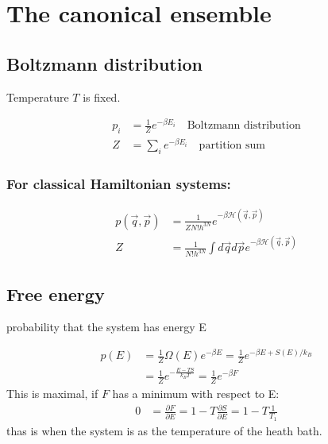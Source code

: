 \section{The canonical ensemble}

\subsection*{Boltzmann distribution}
Temperature $T$ is fixed. 

\begin{equation*}
    \begin{aligned}
        p_i &= \frac{1}{Z} e^{- \beta E_i} \quad \text{Boltzmann distribution} \\
        Z &= \sum_i e^{- \beta E_i} \quad \text{partition sum}
    \end{aligned}
\end{equation*}

\subsubsection*{For classical Hamiltonian systems:}
\begin{equation*}
    \begin{aligned}
        p(\vec{q}, \vec{p}) &= \frac{1}{Z N! h^{3N}} e^{- \beta \mathcal{H}(\vec{q},\vec{p})} \\
        Z &= \frac{1}{N! h^{3N}} \int d\vec{q} d\vec{p} e^{- \beta \mathcal{H}(\vec{q},\vec{p})}
    \end{aligned}
\end{equation*}

\subsection*{Free energy}
probability that the system has energy E

\begin{equation*}
    \begin{aligned}
        p(E) &= \frac{1}{Z} \Omega(E) e^{-\beta E} = \frac{1}{Z} e^{-\beta E + S(E)/k_B} \\
            &= \frac{1}{Z} e^{- \frac{E -TS}{k_B T}} = \frac{1}{Z} e^{-\beta F}
    \end{aligned}
\end{equation*}
This is maximal, if $F$ has a minimum with respect to E:
\begin{equation*}
    \begin{aligned}
        0 &= \frac{\partial F}{\partial E} = 1-T \frac{\partial S}{\partial E} = 1- T \frac{1}{T_1}
    \end{aligned}
\end{equation*}
thas is when the system is as the temperature of the heath bath.

